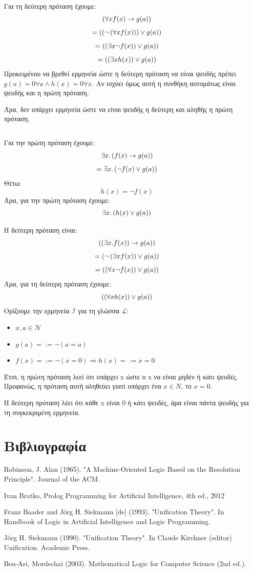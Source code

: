 \documentclass[a4paper,oneside, 11pt]{article}
\newcommand*{\im}{\ensuremath{\to}}
\newcommand*{\ex}{\ensuremath{\exists}}
\newcommand*{\f}{\ensuremath{\forall}}
\newcommand*{\p}{\ensuremath{\left(}}
\newcommand*{\pp}{\ensuremath{\right)}}
\newcommand*{\ww}{\ensuremath{\wedge}}
\newcommand*{\vv}{\ensuremath{\vee}}
\begin{document}
\bigbreak

Για τη δεύτερη πρόταση έχουμε:
$$
\p \f x f(x) \im g(a) \pp 
$$
$$
= \p \p \neg \p \f x f(x) \pp \pp \vv g(a) \pp
$$
$$
= \p \p \ex x \neg f(x) \pp \vv g(a) \pp 
$$
$$
=  \p \p \ex x h(x) \pp \vv g(a) \pp
$$
Προκειμένου να βρεθεί ερμηνεία ώστε η δεύτερη πρόταση να είναι ψευδής πρέπει $g(a) = 0 \f a \ww h(x) = 0 \forall x$. Αν ισχύει όμως αυτή η συνθήκη αυτομάτως είναι ψευδής και η πρώτη πρόταση. \bigbreak

Άρα, δεν υπάρχει ερμηνεία ώστε να είναι ψευδής η δεύτερη και αληθής η πρώτη πρόταση.
 
\subsection{}

Για την πρώτη πρόταση έχουμε:
$$
\ex x. \p f(x) \im g(a) \pp
$$
$$
= \ex x. \p \neg f(x) \vv g(a) \pp
$$
Θέτω:
$$
h(x) = \neg f(x)
$$
Άρα, για την πρώτη πρόταση έχουμε:
$$
\ex x . \p h(x) \vv g(a) \pp
$$
\bigbreak 

Η δεύτερη πρόταση είναι:
$$
\p \p \ex x. f(x) \pp \im g(a) \pp
$$
$$
= \p \neg \p \ex x f(x) \pp  \vv g(a) \pp
$$
$$
= \p \p \f x \neg f(x) \pp \vv g(a) \pp
$$
Άρα, για τη δεύτερη πρόταση έχουμε:
$$
\p \p \f x h(x) \pp \vv g(a) \pp$$
\bigbreak
Ορίζουμε την ερμηνεία $\mathcal{I}$ για τη γλώσσα $\mathcal{L}$:
\begin{itemize}
\item $x, a \in \mathcal{N}$
\item $g(a)=:= \neg (a = a)$
\item $f(x)=:= \neg (x=0) \Rightarrow h(x) =:= x=0$ 
\end{itemize}
\bigbreak
Έτσι, η πρώτη πρόταση λεεί ότι υπάρχει x ώστε ο x να είναι μηδέν ή κάτι ψευδές. Προφανώς, η πρόταση αυτή αληθεύει γιατί υπάρχει ένα $x \in N$, το $x=0$. \bigbreak 

Η δεύτερη πρόταση λέει ότι κάθε x είναι 0 ή κάτι ψευδές, άρα είναι πάντα ψευδής για τη συγκεκριμένη ερμηνεία.


\section{Βιβλιογραφία}
\noindent[1] Robinson, J. Alan (1965). "A Machine-Oriented Logic Based on the Resolution Principle". Journal of the ACM. \par 
\noindent[2] Ivan Bratko, Prolog Programming for Artificial Intelligence, 4th ed., 2012 \par
\noindent[3] Franz Baader and Jörg H. Siekmann [de] (1993). "Unification Theory". In Handbook of Logic in Artificial Intelligence and Logic Programming. \par
\noindent[4] Jörg H. Siekmann (1990). "Unification Theory". In Claude Kirchner (editor) Unification. Academic Press. \par 
\noindent[5] Ben-Ari, Mordechai (2003). Mathematical Logic for Computer Science (2nd ed.).
\end{document}
